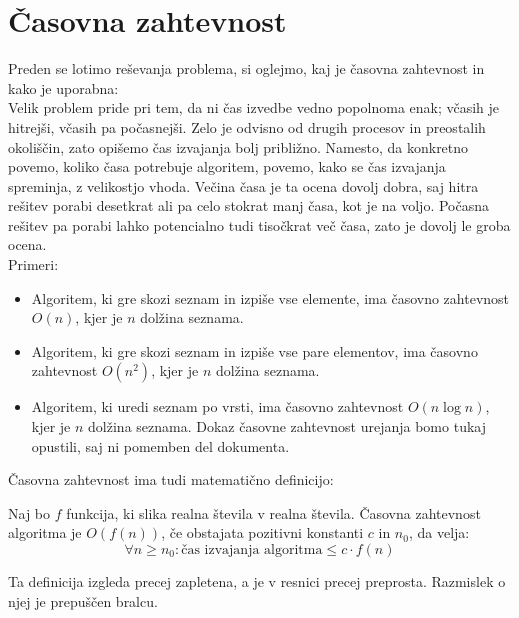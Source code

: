 \section{Časovna zahtevnost}\label{sec:casovna-zahtevnost}
Preden se lotimo reševanja problema, si oglejmo, kaj je časovna zahtevnost in kako je uporabna:\\
Velik problem pride pri tem, da ni čas izvedbe vedno popolnoma enak; včasih je hitrejši, včasih pa počasnejši.
Zelo je odvisno od drugih procesov in preostalih okoliščin, zato opišemo čas izvajanja bolj približno.
Namesto, da konkretno povemo, koliko časa potrebuje algoritem, povemo, kako se čas izvajanja spreminja, z velikostjo vhoda.
Večina časa je ta ocena dovolj dobra, saj hitra rešitev porabi desetkrat ali pa celo stokrat manj časa, kot je na voljo.
Počasna rešitev pa porabi lahko potencialno tudi tisočkrat več časa, zato je dovolj le groba ocena.\\
Primeri:
\begin{itemize}
    \item Algoritem, ki gre skozi seznam in izpiše vse elemente, ima časovno zahtevnost $O(n)$, kjer je $n$ dolžina seznama.
    \item Algoritem, ki gre skozi seznam in izpiše vse pare elementov, ima časovno zahtevnost $O(n^2)$, kjer je $n$ dolžina seznama.
    \item Algoritem, ki uredi seznam po vrsti, ima časovno zahtevnost $O(n\log n)$, kjer je $n$ dolžina seznama.
    Dokaz časovne zahtevnost urejanja bomo tukaj opustili, saj ni pomemben del dokumenta.
\end{itemize}
Časovna zahtevnost ima tudi matematično definicijo:
\begin{definition}
    Naj bo $f$ funkcija, ki slika realna števila v realna števila.
    Časovna zahtevnost algoritma je $O(f(n))$, če obstajata pozitivni konstanti $c$ in $n_0$, da velja:
    \begin{equation*}
        \forall n \geq n_0: \text{čas izvajanja algoritma} \leq c \cdot f(n)
    \end{equation*}
\end{definition}
Ta definicija izgleda precej zapletena, a je v resnici precej preprosta.
Razmislek o njej je prepuščen bralcu.\\
